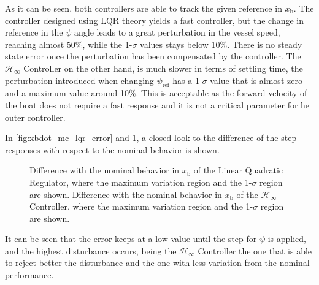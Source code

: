 As it can be seen, both controllers are able to track the given reference in $\dot{x}_\mathrm{b}$. The controller designed using LQR theory yields a fast controller, but the change in reference in the $\psi$ angle leads to a great perturbation in the vessel speed, reaching almost 50\%, while the 1-$\sigma$ values stays below 10\%. There is no steady state error once the perturbation has been compensated by the controller. The $\mathcal{H}_\infty$ Controller on the other hand, is much slower in terms of settling time, the perturbation introduced when changing $\psi_\mathrm{ref}$ has a 1-$\sigma$ value that is almost zero and a maximum value around 10\%. This is acceptable as the forward velocity of the boat does not require a fast response and it is not a critical parameter for he outer controller.

In \autoref{fig:xbdot_mc_lqr_error} and \ref{fig:xbdot_mc_rob_error}, a closed look to the difference of the step responses with respect to the nominal behavior is shown.
\begin{figure}[H]
    \captionbox 
    {   
        Difference with the nominal behavior in $x_\mathrm{b}$ of the Linear Quadratic Regulator, where the maximum variation region and the 1-$\sigma$ region are shown.
        \label{fig:xbdot_mc_lqr_error}
    }                                                                 
    {                                                                  
    }                                                                    
    \hspace{5pt}                                                          
    \captionbox  
    {      
         Difference with the nominal behavior in $x_\mathrm{b}$ of the $\mathcal{H}_\infty$ Controller, where the maximum variation region and the 1-$\sigma$ region are shown.
        \label{fig:xbdot_mc_rob_error}
    }                                                                          
    {
    }
\end{figure}

It can be seen that the error keeps at a low value until the step for $\psi$ is applied, and the highest disturbance occurs, being the $\mathcal{H}_\infty$ Controller the one that is able to reject better the disturbance and the one with less variation from the nominal performance.

